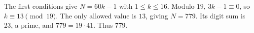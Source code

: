 The first conditions give $N=60k-1$ with $1\le k\le 16$. Modulo $19$, $3k-1\equiv 0$, so $k\equiv 13\pmod{19}$. The only allowed value is $13$, giving $N=779$. Its digit sum is $23$, a prime, and $779=19\cdot 41$. Thus $\boxed{779}$.
